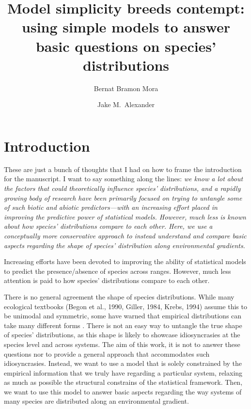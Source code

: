 \documentclass[11pt, a4paper]{article}
\title{\vspace{-1cm}
Model simplicity breeds contempt: using simple models to answer basic questions on species' distributions}
\author[1,*]{\normalsize Bernat Bramon Mora}
\author[1]{\normalsize Jake M.\ Alexander}
\affil[1]{\footnotesize Institute of Integrative Biology, ETH Zürich, Zürich, Switzerland}
\affil[*]{\footnotesize  bernat.bramon@gmail.com}
\date{}
\begin{document}
\maketitle
\linenumbers
\section*{Introduction}
{\color{gray}
These are just a bunch of thoughts that I had on how to frame the introduction for the manuscript. I want to say something along the lines: \textit{we know a lot about the factors that could theoretically influence species' distributions, and a rapidly growing body of research have been primarily focused on trying to untangle some of such biotic and abiotic predictors---with an increasing effort placed in improving the predictive power of statistical models. However, much less is known about how species' distributions compare to each other. Here, we use a conceptually more conservative approach to instead understand and compare basic aspects regarding the shape of species' distribution along environmental gradients.}}

Increasing efforts have been devoted to improving the ability of statistical models to predict the presence/absence of species across ranges. However, much less attention is paid to how species' distributions compare to each other. 

There is no general agreement the shape of species distributions. While many ecological textbooks (Begon et al., 1990, Giller, 1984, Krebs, 1994) assume this to be unimodal and symmetric, some have warned that empirical distributions can take many different forms \citep{austin2002spatial}. There is not an easy way to untangle the true shape of species' distributions, as this shape is likely to showcase idiosyncrasies at the species level and across systems. The aim of this work, it is not to answer these questions nor to provide a general approach that accommodates such idiosyncrasies. Instead, we want to use a model that is solely constrained by the empirical information that we truly have regarding a particular system, relaxing as much as possible the structural constrains of the statistical framework. Then, we want to use this model to answer basic aspects regarding the way systems of many species are distributed along an environmental gradient. 
\end{document}

